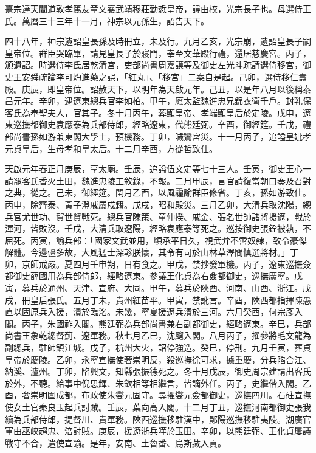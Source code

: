 

熹宗達天闡道敦孝篤友章文襄武靖穆莊勤悊皇帝，諱由校，光宗長子也。母選侍王氏。萬曆三十三年十一月，神宗以元孫生，詔告天下。

四十八年，神宗遺詔皇長孫及時冊立，未及行。九月乙亥，光宗崩，遺詔皇長子嗣皇帝位。群臣哭臨畢，請見皇長子於寢門，奉至文華殿行禮，還居慈慶宮。丙子，頒遺詔。時選侍李氏居乾清宮，吏部尚書周嘉謨等及御史左光斗疏請選侍移宮，御史王安舜疏論李可灼進藥之誤，「紅丸」、「移宮」二案自是起。己卯，選侍移仁壽殿。庚辰，即皇帝位。詔赦天下，以明年為天啟元年。己丑，以是年八月以後稱泰昌元年。辛卯，逮遼東總兵官李如柏。甲午，廕太監魏進忠兄錦衣衛千戶。封乳保客氏為奉聖夫人，官其子。冬十月丙午，葬顯皇帝、孝端顯皇后於定陵。戊申，遼東巡撫都御史袁應泰為兵部侍郎，經略遼東，代熊廷弼。辛酉，御經筵。壬戌，禮部尚書孫如游兼東閣大學士，預機務。丁卯，噦鸞宮災。十一月丙子，追謚皇妣孝元貞皇后，生母孝和皇太后。十二月辛酉，方從哲致仕。

天啟元年春正月庚辰，享太廟。壬辰，追謚伍文定等七十三人。壬寅，御史王心一請罷客氏香火土田，魏進忠陵工敘錄，不報。二月甲辰，言官請復當朝口奏及召對之典，從之。己未，御經筵。閏月乙酉，以風霾諭群臣修省。丁亥，孫如游致仕。丙申，除齊泰、黃子澄戚屬戍籍。戊戌，昭和殿災。三月乙卯，大清兵取沈陽，總兵官尤世功、賀世賢戰死。總兵官陳策、童仲揆、戚金、張名世帥諸將援遼，戰於渾河，皆敗沒。壬戌，大清兵取遼陽，經略袁應泰等死之。巡按御史張銓被執，不屈死。丙寅，諭兵部：「國家文武並用，頃承平日久，視武弁不啻奴隸，致令豪傑解體。今邊疆多故，大風猛士深軫朕懷，其令有司於山林草澤間慎選將材。」丁卯，京師戒嚴。夏四月壬申朔，日有食之。甲戌，禁抄發軍機。丙子，遼東巡撫僉都御史薛國用為兵部侍郎，經略遼東。參議王化貞為右僉都御史，巡撫廣寧。戊寅，募兵於通州、天津、宣府、大同。甲午，募兵於陜西、河南、山西、浙江。戊戌，冊皇后張氏。五月丁未，貴州紅苗平。甲寅，禁訛言。辛酉，陜西都指揮陳愚直以固原兵入援，潰於臨洺。未幾，寧夏援遼兵潰於三河。六月癸酉，何宗彥入閣。丙子，朱國祚入閣。熊廷弼為兵部尚書兼右副都御史，經略遼東。辛巳，兵部尚書王象乾總督薊、遼軍務。秋七月乙巳，沈飀入閣。八月丙子，擢參將毛文龍為副總兵，駐師鎮江城。戊子，杭州大火，詔停強造。癸巳，停刑。九月壬寅，葬貞皇帝於慶陵。乙卯，永寧宣撫使奢崇明反，殺巡撫徐可求，據重慶，分兵陷合江、納溪、瀘州。丁卯，陷興文，知縣張振德死之。冬十月戊辰，御史周宗建請出客氏於外，不聽。給事中倪思輝、朱欽相等相繼言，皆謫外任。丙子，史繼偕入閣。乙酉，奢崇明圍成都，布政使朱燮元固守。尋擢燮元僉都御史，巡撫四川。石砫宣撫使女土官秦良玉起兵討賊。壬辰，葉向高入閣。十二月丁丑，巡撫河南都御史張我續為兵部侍郎，提督川、貴軍務。陜西巡撫移駐漢中，鄖陽巡撫移駐夷陵。湖廣官軍由巫峽趨忠、涪討賊。庚辰，援遼浙兵嘩於玉田。辛卯，以熊廷弼、王化貞屢議戰守不合，遣使宣諭。是年，安南、土魯番、烏斯藏入貢。

